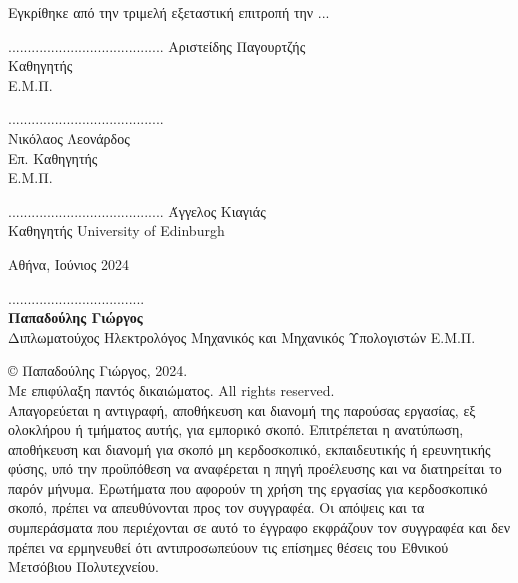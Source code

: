 \noindent
Εγκρίθηκε από την τριμελή εξεταστική επιτροπή την ...
\vspace{10ex}
\begin{center}
\scriptsize
\parbox[b]{0.3\textwidth} {\center
	........................................
	Αριστείδης Παγουρτζής \\
	Καθηγητής \\Ε.Μ.Π.
}
\parbox[b]{0.3\textwidth} {\center
	........................................\\
	Νικόλαος Λεονάρδος \\
	Επ. Καθηγητής \\Ε.Μ.Π.
}
\parbox[b]{0.3\textwidth} {\center
	........................................
	Άγγελος Κιαγιάς \\
	Καθηγητής University of Edinburgh
}

\vspace{20ex}
\normalsize
\noindent
Αθήνα, Ιούνιος 2024
\newpage
\end{center}
\hspace{10pt}

\vspace{30ex}
\noindent
................................... \\
\textbf{Παπαδούλης Γιώργος} \\
Διπλωματούχος Ηλεκτρολόγος Μηχανικός και Μηχανικός Υπολογιστών Ε.Μ.Π. \\
\vspace{40ex}

\small
\noindent
\copyright \hspace{1em} Παπαδούλης Γιώργος, 2024. \\
Με επιφύλαξη παντός δικαιώματος. All rights reserved. \\
Απαγορεύεται η αντιγραφή, αποθήκευση και διανομή της παρούσας εργασίας, εξ ολοκλήρου ή τμήματος
αυτής, για εμπορικό σκοπό. Επιτρέπεται η ανατύπωση, αποθήκευση και διανομή για σκοπό μη κερδοσκοπικό,
εκπαιδευτικής ή ερευνητικής φύσης, υπό την προϋπόθεση να αναφέρεται η πηγή προέλευσης και να διατηρείται το παρόν μήνυμα. Ερωτήματα που αφορούν τη χρήση της εργασίας για κερδοσκοπικό σκοπό, πρέπει να
απευθύνονται προς τον συγγραφέα.
Οι απόψεις και τα συμπεράσματα που περιέχονται σε αυτό το έγγραφο εκφράζουν τον συγγραφέα και δεν
πρέπει να ερμηνευθεί ότι αντιπροσωπεύουν τις επίσημες θέσεις του Εθνικού Μετσόβιου Πολυτεχνείου.

            
